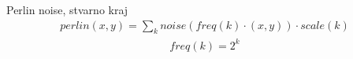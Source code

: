 \documentclass[9pt]{beamer}
\begin{document}
\begin{frame}{Perlin noise, stvarno kraj}
	\begin{align*}
		perlin(x, y) = \sum_{k}noise(freq(k)\cdot (x,y))\cdot scale(k)
	\end{align*}
	\begin{align*}
	freq(k) = 2^k 
	\end{align*}
\end{frame}
%
%
\end{document}
